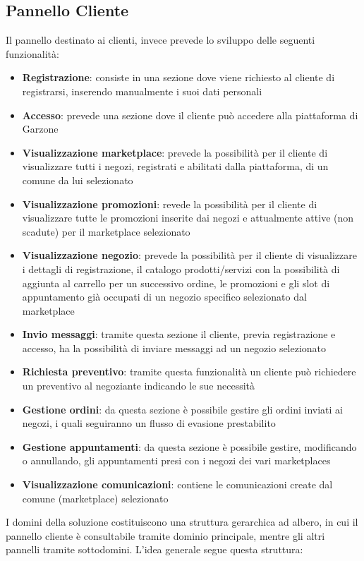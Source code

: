 \subsection{Pannello Cliente} Il pannello destinato ai clienti, invece prevede lo sviluppo delle seguenti funzionalità:
\begin{itemize}
    \item \textbf{Registrazione}: consiste in una sezione dove viene richiesto al cliente di registrarsi, inserendo manualmente i suoi dati personali
    \item \textbf{Accesso}: prevede una sezione dove il cliente può accedere alla piattaforma di Garzone
    \item \textbf{Visualizzazione marketplace}: prevede la possibilità per il cliente di visualizzare tutti i negozi, registrati e abilitati dalla piattaforma, di un comune da lui selezionato
    \item \textbf{Visualizzazione promozioni}: revede la possibilità per il cliente di visualizzare tutte le promozioni inserite dai negozi  e attualmente attive (non scadute) per il marketplace selezionato
    \item \textbf{Visualizzazione negozio}: prevede la possibilità per il cliente di visualizzare i dettagli di registrazione, il catalogo prodotti/servizi con la possibilità di aggiunta al carrello per un successivo ordine, le promozioni e gli slot di appuntamento già occupati di un negozio specifico selezionato dal marketplace
    \item \textbf{Invio messaggi}: tramite questa sezione il cliente, previa registrazione e accesso, ha la possibilità di inviare messaggi ad un negozio selezionato
    \item \textbf{Richiesta preventivo}: tramite questa funzionalità un cliente può richiedere un preventivo al negoziante indicando le sue necessità
    \item \textbf{Gestione ordini}: da questa sezione è possibile gestire gli ordini inviati ai negozi, i quali seguiranno un flusso di evasione prestabilito
    \item \textbf{Gestione appuntamenti}: da questa sezione è possibile gestire, modificando o annullando, gli appuntamenti presi con i negozi dei vari marketplaces
    \item \textbf{Visualizzazione comunicazioni}: contiene le comunicazioni create dal comune (marketplace) selezionato
\end{itemize}
\newpage
I domini della soluzione costituiscono una struttura gerarchica ad albero, in cui il pannello cliente è consultabile tramite dominio principale, mentre gli altri pannelli tramite sottodomini. L'idea generale segue questa struttura:
